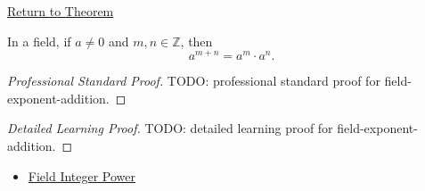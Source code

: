 \newpage
{}
\label{prf:field-exponent-addition}

\begin{remark*}[Return]
\hyperref[thm:field-exponent-addition]{Return to Theorem}
\end{remark*}

\begin{theorem*}
In a field, if $a\ne0$ and $m,n\in\mathbb{Z}$, then
\[
a^{m+n}=a^m\cdot a^n.
\]
\end{theorem*}

\begin{proof}[Professional Standard Proof]
\LRAProofBodyStart
TODO: professional standard proof for field-exponent-addition.
\end{proof}

\begin{proof}[Detailed Learning Proof]
\LRAProofBodyStart
TODO: detailed learning proof for field-exponent-addition.
\end{proof}

\begin{remark*}
\end{remark*}

\begin{dependencies}
\begin{itemize}
  \item \hyperref[def:two-sided-inverse]{Field Integer Power}
\end{itemize}
\end{dependencies}

\clearpage
